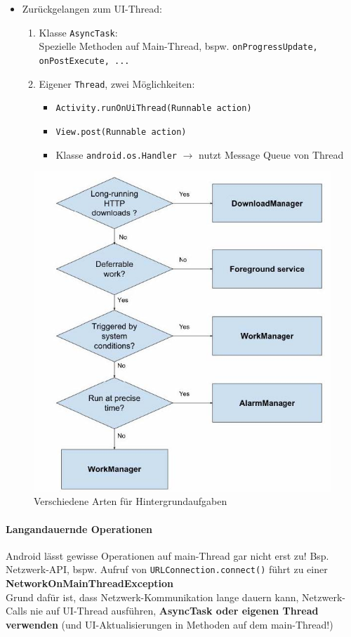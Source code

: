 \documentclass[a4paper]{article}
\begin{document}
\begin{itemize}
\begin{enumerate}
					\end{enumerate}
				\item Zurückgelangen zum UI-Thread:
					\begin{enumerate}
						\item Klasse \texttt{AsyncTask}: \\
						Spezielle Methoden auf Main-Thread, bspw. \texttt{onProgressUpdate, onPostExecute, ...}
						\item Eigener \texttt{Thread}, zwei Möglichkeiten:
							\begin{itemize}
								\item \texttt{Activity.runOnUiThread(Runnable action)}
								\item \texttt{View.post(Runnable action)}
								\item Klasse \texttt{android.os.Handler} $\rightarrow$ nutzt Message Queue von Thread
							\end{itemize}
					\end{enumerate}
			\end{itemize}
			\newpage
			\begin{figure}[htb!]
				\centering
				\includegraphics[width=.6\textwidth]{img/background_work.jpg}
				\caption{Verschiedene Arten für Hintergrundaufgaben}
			\end{figure}
		
			\paragraph{Langandauernde Operationen}
			Android lässt gewisse Operationen auf main-Thread gar nicht erst zu!
			Bsp. Netzwerk-API, bspw. Aufruf von \texttt{URLConnection.connect()} führt zu einer\\ \textbf{NetworkOnMainThreadException}\\
			Grund dafür ist, dass Netzwerk-Kommunikation lange dauern kann, Netzwerk-Calls nie auf UI-Thread ausführen, \textbf{AsyncTask oder eigenen Thread verwenden} (und UI-Aktualisierungen in Methoden auf dem main-Thread!)
	
\end{document}
